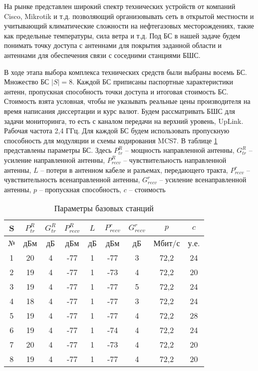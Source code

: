 На рынке представлен широкий спектр технических устройств от компаний Cisco, Mikrotik и т.д. позволяющий организовывать сеть в открытой местности и учитывающий климатические сложности на нефтегазовых месторождениях, такие как предельные температуры, сила ветра и т.д. Под БС в нашей задаче будем понимать точку доступа с антеннами для покрытия заданной области и антеннами для обеспечения связи с соседними станциями БШС. 

В ходе этапа выбора комплекса технических средств были выбраны восемь БС. Множество БС $|S| = 8$. Каждой БС приписаны паспортные характеристики антенн, пропускная способность точки доступа и итоговая стоимость БС. Стоимость взята условная, чтобы не указывать реальные цены производителя на время написания диссертации и курс валют. Будем рассматривать БШС для задачи мониторинга, то есть с каналом передачи на верхний уровень, UpLink. Рабочая частота 2,4 ГГц. Для каждой БС будем использовать пропускную способность для модуляции и схемы кодирования MCS7.  В таблице \cref{tab:sta_parameters} представлены параметры БС. Здесь $P_{tr}^{R}$ -- мощность направленной антенны, $G_{tr}^R$ -- усиление направленной антенны, $P_{recv}^R$ -- чувствительность направленной антенны, $L$  -- потери в антенном кабеле и разъемах, передающего тракта, $P_{recv}^r$ -- чувствительность всенаправленной антенны, $G_{recv}^r$ -- усиление всенаправленной антенны,  $p$ – пропускная способность, $c$ – стоимость


\begin{table}[h!]\centering
  \begin{tabular}{|c||c|c|c|c|c|c|c|c|}\hline
      
      S&	$P_{tr}^R$&	$G_{tr}^R$&	$P_{recv}^R$&	$L$&	$P_{recv}^r$&	$G_{recv}^r$&	$p$&	$c$ \\
      \hline
      №&	дБм&	дБ&	дБм&	дБ&	дБм&	дБ&	Мбит/с&	у.е. \\
      \hline
      1&	20&	4&	-77&	1&	-77&	3&	72,2& 24 \\
      2&	19&	4&	-77&	1&	-73&	4&	72,2&	20 \\
      3&	19&	4&	-77&	1&	-77&	5&	72,2&	24 \\
      4&	18&	4&	-77&	1&	-77&	3&	72,2&	24 \\
      5&	19&	4&	-77&	1&	-77&	4&	72,2&	28 \\
      6&	19&	4&	-77&	1&	-74&	4&	72,2&	24 \\
      7&	20&	4&	-77&	1&	-73&	4&	72,2&	20 \\
      8&	19&	4&	-77&	1&	-77&	4&	72,2&	20 \\
      \hline

\end{tabular}\caption{Параметры базовых станций}\label{tab:sta_parameters}
\end{table}

